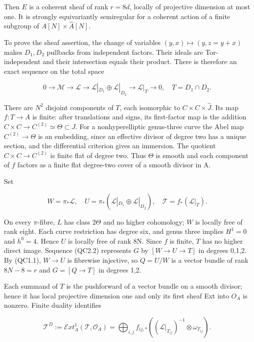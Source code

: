 Then \(E\) is a coherent sheaf of rank \(r=8d\), locally of projective
dimension at most one. It is strongly equivariantly semiregular for a
coherent action of a finite subgroup of \(A[N]\times \widehat{A}[N]\).

To prove the sheaf assertion, the change of variables
\((y,x)\mapsto (y,z=y+x)\) makes \(D_{1},D_{2}\) pullbacks from
independent factors. Their ideals are Tor-independent and their
intersection equals their product. There is therefore an exact sequence
on the total space

\[
 0\longrightarrow\mathcal M\longrightarrow\mathcal L
 \longrightarrow\mathcal L|_{D_1}\oplus\mathcal L|_{D_2}
 \longrightarrow\mathcal L|_T\longrightarrow0,
 \quad T=D_1\cap D_2.
 \tag{QC2.2}
\]

There are \(N^{2}\) disjoint components of \(T\), each isomorphic to
\(C\times C\times \widehat{J}\). Its map \(f:T\to A\) is finite: after
translations and signs, its first-factor map is the addition
\(C\times C\to C^{(2)}\simeq\Theta\subset J\). For a nonhyperelliptic
genus-three curve the Abel map \(C^{(2)}\to\Theta\) is an embedding,
since an effective divisor of degree two has a unique section, and the
differential criterion gives an immersion. The quotient
\(C\times C\to C^{(2)}\) is finite flat of degree two. Thus \(\Theta\)
is smooth and each component of \(f\) factors as a finite flat
degree-two cover of a smooth divisor in A.

Set

\[
 W=\pi_*\mathcal L,\quad
 U=\pi_*(\mathcal L|_{D_1}\oplus\mathcal L|_{D_2}),\quad
 \mathcal T=f_*(\mathcal L|_T).
\]

On every \(\pi\)-fibre, \(L\) has class \(2\Theta\) and no higher
cohomology; \(W\) is locally free of rank eight. Each curve restriction
has degree six, and genus three implies \(H^{1}=0\) and \(h^{0}=4\).
Hence \(U\) is locally free of rank 8N. Since \(f\) is finite, \(T\) has
no higher direct image. Sequence (QC2.2) represents \(G\) by
\([W\to U\to T]\) in degrees 0,1,2. By (QC1.1), \(W\to U\) is fibrewise
injective, so \(Q=U/W\) is a vector bundle of rank \(8N-8=r\) and
\(G=[Q\to T]\) in degrees 1,2.

Each summand of \(T\) is the pushforward of a vector bundle on a smooth
divisor; hence it has local projective dimension one and only its first
sheaf Ext into \(O_A\) is nonzero. Finite duality identifies

\[
 \mathcal T^D:=\mathcal E xt_A^1(\mathcal T,\mathcal O_A)
 =\bigoplus_{i,j} f_{ij,*}
       ((\mathcal L|_{T_{ij}})^{-1}\otimes\omega_{T_{ij}}).
\]

